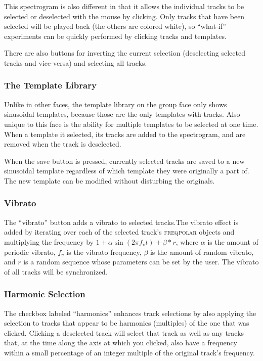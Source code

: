 \documentclass{article}
\newcommand{\noun}[1]{\textsc{#1}}
\begin{document}
This spectrogram is also different in that it allows the individual tracks to
be selected or deselected with the mouse by clicking. Only tracks that have
been selected will be played back (the others are colored white), so
``what-if'' experiments can be quickly performed by clicking tracks and
templates.

There are also buttons for inverting the current selection (deselecting
selected tracks and vice-versa) and selecting all tracks.

\subsubsection{The Template Library}

Unlike in other faces, the template library on the group face only shows
sinusoidal templates, because those are the only templates with tracks. Also
unique to this face is the ability for multiple templates to be selected at one
time. When a template it selected, its tracks are added to the spectrogram, and
are removed when the track is deselected.

When the save button is pressed, currently selected tracks are saved to a new
sinusoidal template regardless of which template they were originally a part
of. The new template can be modified without disturbing the originals.

\subsubsection{Vibrato}

The ``vibrato'' button adds a vibrato to selected tracks.The vibrato effect is
added by iterating over each of the selected track's \noun{freqpolar} objects
and multiplying the frequency by $1+\alpha\sin(2 \pi f_v t)+\beta*r$, where
$\alpha$ is the amount of periodic vibrato, $f_v$ is the vibrato frequency,
$\beta$ is the amount of random vibrato, and $r$ is a random sequence whose
parameters can be set by the user.  The vibrato of all tracks will be
synchronized.


\subsubsection{\label{sub:harmonic-selection}Harmonic Selection}

The checkbox labeled ``harmonics'' enhances track selections by also applying
the selection to tracks that appear to be harmonics (multiples) of the one that
was clicked. Clicking a deselected track will select that track as well as any
tracks that, at the time along the axis at which you clicked, also have a
frequency within a small percentage of an integer multiple of the original
track's frequency.
\end{document}
